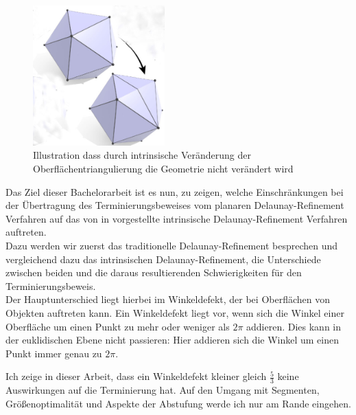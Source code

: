 \begin{figure}[H]%
    
    \centering
    \includegraphics[width=2in]{images/intrinsch_kantenflip.jpg}
  \caption{Illustration  dass durch intrinsische Veränderung der Oberflächentriangulierung  die Geometrie nicht verändert wird \cite{Sharp:2019:NIT}}
  \label{fig:intrinischer_kanten_flip}
\end{figure}
\newpage
Das Ziel dieser Bachelorarbeit ist es nun, zu zeigen, welche Einschränkungen bei der Übertragung des Terminierungsbeweises vom planaren Delaunay-Refinement  Verfahren \cite{chew:1989:guaranteed,ruppert:1995:delaunay,SHEWCHUK:2002:chuws} auf das von  \citeauthor{Sharp:2019:NIT} in   \cite{Sharp:2019:NIT}  vorgestellte intrinsische Delaunay-Refinement  Verfahren auftreten.\\ Dazu werden wir zuerst das traditionelle Delaunay-Refinement  besprechen und vergleichend dazu das intrinsischen Delaunay-Refinement, die Unterschiede zwischen beiden und die daraus resultierenden Schwierigkeiten für den Terminierungsbeweis.\\ 


Der Hauptunterschied liegt hierbei im Winkeldefekt, der bei Oberflächen von Objekten auftreten kann. Ein Winkeldefekt liegt vor, wenn sich die Winkel einer Oberfläche um einen Punkt zu mehr oder weniger als $2\pi$ addieren. Dies kann in der euklidischen Ebene nicht passieren: Hier addieren sich die Winkel um einen Punkt immer genau zu $2\pi$.



Ich zeige in dieser Arbeit, dass ein Winkeldefekt kleiner gleich $\frac{5}{3}$ keine Auswirkungen auf die Terminierung hat. Auf den Umgang mit Segmenten, Größenoptimalität und Aspekte der Abstufung werde ich nur am Rande eingehen.\\










